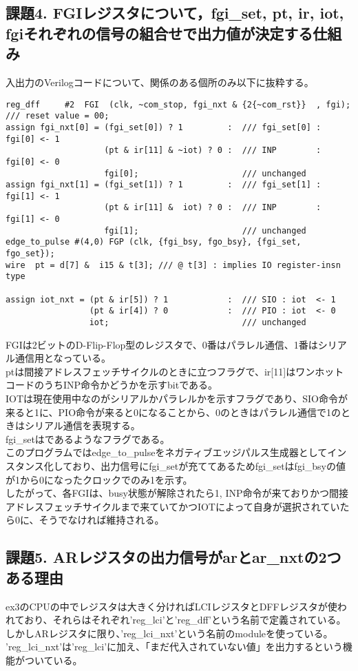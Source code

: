 \documentclass{jsarticle}
\begin{document}
\subsection*{課題4. FGIレジスタについて，fgi\_set, pt, ir, iot, fgiそれぞれの信号の組合せで出力値が決定する仕組み}
入出力のVerilogコードについて、関係のある個所のみ以下に抜粋する。
\begin{lstlisting}
reg_dff     #2  FGI  (clk, ~com_stop, fgi_nxt & {2{~com_rst}}  , fgi);  /// reset value = 00;
assign fgi_nxt[0] = (fgi_set[0]) ? 1         :  /// fgi_set[0] : fgi[0] <- 1
                    (pt & ir[11] & ~iot) ? 0 :  /// INP        : fgi[0] <- 0
                    fgi[0];                     /// unchanged
assign fgi_nxt[1] = (fgi_set[1]) ? 1         :  /// fgi_set[1] : fgi[1] <- 1
                    (pt & ir[11] &  iot) ? 0 :  /// INP        : fgi[1] <- 0
                    fgi[1];                     /// unchanged
edge_to_pulse #(4,0) FGP (clk, {fgi_bsy, fgo_bsy}, {fgi_set, fgo_set});
wire  pt = d[7] &  i15 & t[3]; /// @ t[3] : implies IO register-insn type

assign iot_nxt = (pt & ir[5]) ? 1            :  /// SIO : iot  <- 1
                 (pt & ir[4]) ? 0            :  /// PIO : iot  <- 0
                 iot;                           /// unchanged
\end{lstlisting}

FGIは2ビットのD-Flip-Flop型のレジスタで、0番はパラレル通信、1番はシリアル通信用となっている。\\
ptは間接アドレスフェッチサイクルのときに立つフラグで、ir[11]はワンホットコードのうちINP命令かどうかを示すbitである。\\
IOTは現在使用中なのがシリアルかパラレルかを示すフラグであり、SIO命令が来ると1に、PIO命令が来ると0になることから、0のときはパラレル通信で1のときはシリアル通信を表現する。\\
fgi\_setはであるようなフラグである。\\
このプログラムではedge\_to\_pulseをネガティブエッジパルス生成器としてインスタンス化しており、出力信号にfgi\_setが充ててあるためfgi\_setはfgi\_bsyの値が1から0になったクロックでのみ1を示す。\\

したがって、各FGIは、busy状態が解除されたら1, INP命令が来ておりかつ間接アドレスフェッチサイクルまで来ていてかつIOTによって自身が選択されていたら0に、そうでなければ維持される。

\subsection*{課題5. ARレジスタの出力信号がarとar\_nxtの2つある理由}
ex3のCPUの中でレジスタは大きく分ければLCIレジスタとDFFレジスタが使われており、それらはそれぞれ'reg\_lci'と'reg\_dff'という名前で定義されている。\\
しかしARレジスタに限り、'reg\_lci\_nxt'という名前のmoduleを使っている。\\
'reg\_lci\_nxt'は'reg\_lci'に加え、「まだ代入されていない値」を出力するという機能がついている。\\
\end{document}
